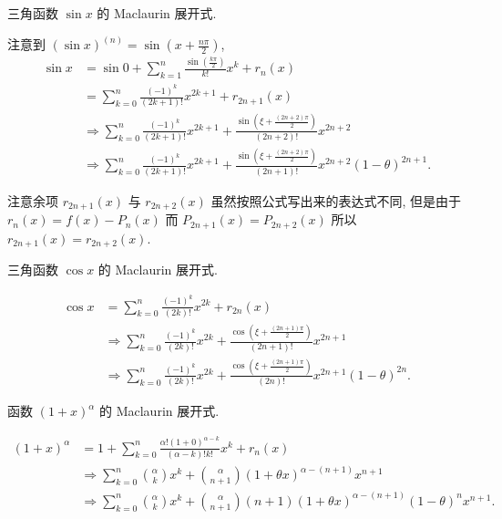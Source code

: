 \documentclass[cn,toc=twocol]{elegantbook}
\begin{document}
\begin{example}
	三角函数 $\sin x$ 的 Maclaurin 展开式.
\end{example}

\begin{solution}
注意到 $(\sin x)^{(n)} = \sin (x+\frac{n\pi}{2})$,
\[
	\begin{aligned}
		\sin x &= \sin 0 + \sum_{k = 1}^n \frac{\sin\left(\frac{k\pi}{2}\right)}{k!} x^k + r_n(x)\\
		&= \sum_{k = 0}^n \frac{(-1)^k}{(2k + 1)!} x^{2k+1} + r_{2n + 1}(x)\\
		&\Rightarrow \sum_{k = 0}^n \frac{(-1)^k}{(2k + 1)!} x^{2k+1} + \frac{\sin\left(\xi + \frac{(2n + 2)\pi}{2}\right)}{(2n+2)!} x^{2n+2}\\
		&\Rightarrow \sum_{k = 0}^n \frac{(-1)^k}{(2k + 1)!} x^{2k+1} + \frac{\sin\left(\xi + \frac{(2n + 2)\pi}{2}\right)}{(2n+1)!} x^{2n+2}(1-\theta)^{2n+1}.
	\end{aligned}
\]
\end{solution}
\begin{remark}
注意余项 $r_{2n+1}(x)$ 与 $r_{2n+2}(x)$ 虽然按照公式写出来的表达式不同, 但是由于 $r_n(x) = f(x) - P_n(x)$ 而 $P_{2n+1}(x) = P_{2n+2}(x)$ 所以 $r_{2n+1}(x) = r_{2n+2}(x)$.	
\end{remark}
\vspace{0.5em}

\begin{example}
	三角函数 $\cos x$ 的 Maclaurin 展开式.
\end{example}

\begin{solution}
\[
	\begin{aligned}
		\cos x &= \sum_{k = 0}^n \frac{(-1)^k}{(2k)!} x^{2k} + r_{2n}(x)\\
		&\Rightarrow \sum_{k = 0}^n \frac{(-1)^k}{(2k)!} x^{2k} + \frac{\cos\left(\xi + \frac{(2n + 1)\pi}{2}\right)}{(2n+1)!} x^{2n+1}\\
		&\Rightarrow \sum_{k = 0}^n \frac{(-1)^k}{(2k)!} x^{2k} + \frac{\cos\left(\xi + \frac{(2n + 1)\pi}{2}\right)}{(2n)!} x^{2n+1}(1-\theta)^{2n}.
	\end{aligned}
\]
\end{solution}
\vspace{0.5em}

\begin{example}
	函数 $(1 + x)^\alpha$ 的 Maclaurin 展开式.
\end{example}

\begin{solution}
\[
	\begin{aligned}
		(1 + x)^\alpha &= 1 + \sum_{k = 0}^n \frac{\alpha!(1+0)^{\alpha-k}}{(\alpha-k)!k!}x^k + r_n(x)\\
		&\Rightarrow \sum_{k = 0}^n {\alpha \choose k} x^k + {\alpha \choose n+1} (1+\theta x)^{\alpha - (n + 1)} x^{n+1}\\
		&\Rightarrow \sum_{k = 0}^n {\alpha \choose k} x^k + {\alpha \choose n+1} (n+1) (1+\theta x)^{\alpha - (n + 1)} (1-\theta)^{n}x^{n+1}.
	\end{aligned}
\]
\end{solution}
\end{document}
